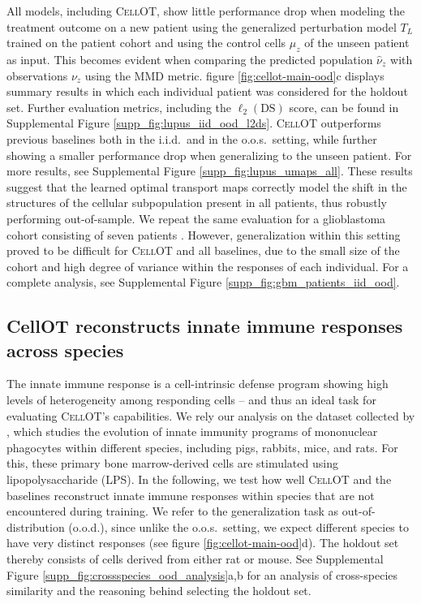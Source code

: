 All models, including \textsc{CellOT}, show little performance drop when modeling the treatment outcome on a new patient using the generalized perturbation model $T_L$ trained on the patient cohort and using the control cells $\mu_z$ of the unseen patient as input.
This becomes evident when comparing the predicted population $\hat{\nu}_z$ with observations $\nu_z$ using the MMD metric. figure \ref{fig:cellot-main-ood}c displays summary results in which each individual patient was considered for the holdout set.
Further evaluation metrics, including the $\ell_2(\text{DS})$ score, can be found in Supplemental Figure \ref{supp_fig:lupus_iid_ood_l2ds}.
\textsc{CellOT} outperforms previous baselines both in the i.i.d.~and in the o.o.s.~setting, while further showing a smaller performance drop when generalizing to the unseen patient.
For more results, see Supplemental Figure \ref{supp_fig:lupus_umaps_all}.
These results suggest that the learned optimal transport maps correctly model the shift in the structures of the cellular subpopulation present in all patients, thus robustly performing out-of-sample.
We repeat the same evaluation for a glioblastoma cohort consisting of seven patients \cite{zhao2021}.
However, generalization within this setting proved to be difficult for \textsc{CellOT} and all baselines, due to the small size of the cohort and high degree of variance within the responses of each individual. 
For a complete analysis, see Supplemental Figure \ref{supp_fig:gbm_patients_iid_ood}.

\subsection{CellOT reconstructs innate immune responses across species}

The innate immune response is a cell-intrinsic defense program showing high levels of heterogeneity among responding cells -- and thus an ideal task for evaluating \textsc{CellOT}'s capabilities.
We rely our analysis on the dataset collected by \citet{hagai2018}, which studies the evolution of innate immunity programs of mononuclear phagocytes within different species, including pigs, rabbits, mice, and rats.
For this, these primary bone marrow-derived cells are stimulated using lipopolysaccharide (LPS).
In the following, we test how well \textsc{CellOT} and the baselines reconstruct innate immune responses within species that are not encountered during training.
We refer to the generalization task as out-of-distribution (o.o.d.), since unlike the o.o.s.~setting, we expect different species to have very distinct responses (see figure \ref{fig:cellot-main-ood}d).
The holdout set thereby consists of cells derived from either rat or mouse. See Supplemental Figure \ref{supp_fig:crossspecies_ood_analysis}a,b for an analysis of cross-species similarity and the reasoning behind selecting the holdout set.

